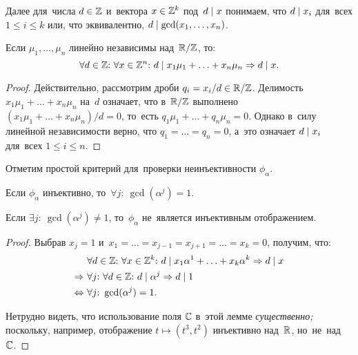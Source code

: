 \documentclass{article}
\begin{document}
Далее для~числа $d \in \mathbb{Z}$ и~вектора $x \in \mathbb{Z}^k$ под~$d \mid x$ понимаем, что $d \mid x_i$ для~всех $1 \leq i \leq k$
или, что эквивалентно, $d \mid \gcd(x_1, \ldots, x_n)$.

\begin{lemma*}
    Если $\mu_1, \ldots, \mu_n$ линейно независимы над~$\mathbb{R} / \mathbb{Z}$, то:
    $$
        \forall d \in \Z{:}\ \forall x \in \Z^n{:}\ d \divides x_1 \mu_1 + \ldots + x_n \mu_n \Rightarrow d \divides x.
    $$
\end{lemma*}

\begin{proof}
    Действительно, рассмотрим дроби $q_i = x_i / d \in \mathbb{R} / \mathbb{Z}$. Делимость $x_1 \mu_1 + \ldots + x_n \mu_n$ на~$d$ означает,
    что в~$\mathbb{R} / \mathbb{Z}$ выполнено $(x_1 \mu_1 + \ldots + x_n \mu_n) / d = 0$, то~есть $q_1 \mu_1 + \ldots + q_n \mu_n = 0$.
    Однако в~силу линейной независимости верно, что $q_1 = \ldots = q_n = 0$, а~это означает $d \mid x_i$ для~всех $1 \leq i \leq n$.
\end{proof}

Отметим простой критерий для~проверки неинъективности $\phi_\alpha$.

\begin{lemma*}
    Если $\phi_\alpha$ инъективно, то~$\forall j{:}\ \gcd(\alpha^j) = 1$.
\end{lemma*}

\begin{consequence*}
    Если $\exists j{:}\ \gcd(\alpha^j) \neq 1$, то~$\phi_\alpha$ не~является инъективным отображением.
\end{consequence*}

\begin{proof}
    Выбрав $x_j = 1$ и~$x_1 = \ldots = x_{j - 1} = x_{j + 1} = \ldots = x_k = 0$, получим, что:
    \begin{align*}
                         & \forall d \in \mathbb{Z}{:}\ \forall x \in \mathbb{Z}^k{:}\ d \mid x_1 \alpha^1 + \ldots + x_k \alpha^k \Rightarrow d \mid x \\
            \Rightarrow\ & \forall j{:}\ \forall d \in \mathbb{Z}{:}\ d \mid \alpha^j \Rightarrow d \mid 1 \\
        \Leftrightarrow\ & \forall j{:}\ \gcd(\alpha^j) = 1.
    \end{align*}

    Нетрудно видеть, что использование поля $\mathbb{C}$ в~этой лемме \textit{существенно;} поскольку, например,
    отображение $t \mapsto (t^3, t^2)$ инъективно над~$\mathbb{R}$, но~не~над~$\mathbb{C}$.
\end{proof}
\end{document}
